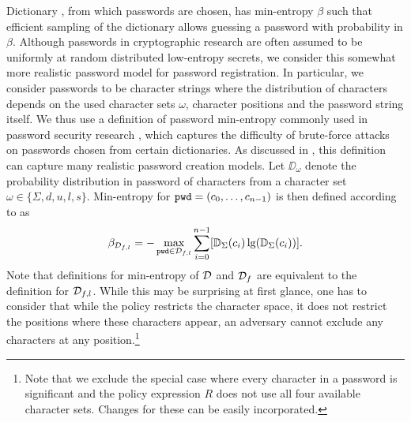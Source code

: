 Dictionary \cD, from which passwords are chosen, has min-entropy $\beta$ such that efficient sampling of the dictionary allows guessing a password with probability in $\beta$.
Although passwords in cryptographic research are often assumed to be uniformly at random distributed low-entropy secrets, we consider this somewhat more realistic password model for password registration.
In particular, we consider passwords to be character strings where the distribution of characters depends on the used character sets $\omega$, character positions and the password string itself.
We thus use a definition of password min-entropy commonly used in password security research \cite{ShayKKLMBCC10,KomanduriSKMBCCE11,MazurekKVBCCKSU13}, which captures the difficulty of brute-force attacks on passwords chosen from certain dictionaries.
As discussed in \cite{ShayKKLMBCC10,KomanduriSKMBCCE11}, this definition can capture many realistic password creation models.
Let $\DD_\omega$ denote the probability distribution in password \pwd of characters from a character set $\omega\in\{\Sigma,d,u,l,s\}$.
Min-entropy for $\mathtt{pwd}=(c_0,\dots,c_{n-1})$ is then defined according to \citet{shannon48} as
\[
  \beta_{\mathcal{D}_{f,l}} = -\max_{\mathtt{pwd}\in \mathcal{D}_{f,l}} \sum_{i=0}^{n-1} [\mathbb{D}_\Sigma(c_i)\lg(\mathbb{D}_\Sigma(c_i))].
\]
Note that definitions for min-entropy of $\mathcal{D}$ and $\mathcal{D}_f$ are equivalent to the definition for $\mathcal{D}_{f,l}$.
While this may be surprising at first glance, one has to consider that while the policy restricts the character space, it does not restrict the positions where these characters appear, \ie an adversary cannot exclude any characters at any position.\footnote{Note that we exclude the special case where every character in a password is significant and the policy expression $R$ does not use all four available character sets. Changes for these can be easily incorporated.}

